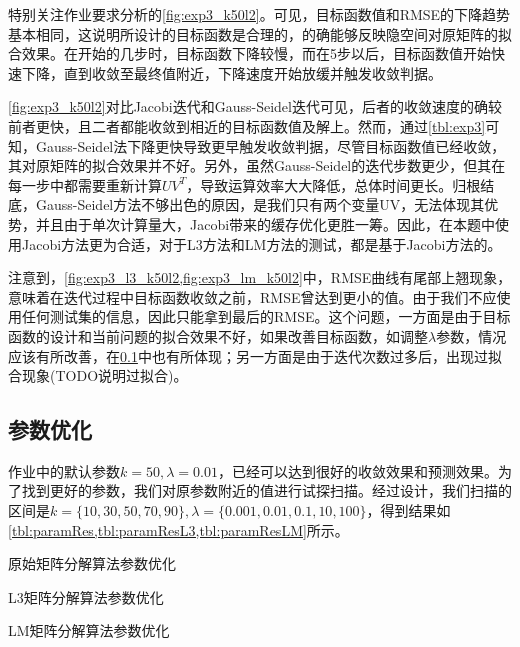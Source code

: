 \documentclass[a4paper,12pt]{article}
\begin{document}
    特别关注作业要求分析的\cref{fig:exp3_k50l2}。可见，目标函数值和RMSE的下降趋势基本相同，这说明所设计的目标函数是合理的，的确能够反映隐空间对原矩阵的拟合效果。在开始的几步时，目标函数下降较慢，而在5步以后，目标函数值开始快速下降，直到收敛至最终值附近，下降速度开始放缓并触发收敛判据。

    \cref{fig:exp3_k50l2}对比Jacobi迭代和Gauss-Seidel迭代可见，后者的收敛速度的确较前者更快，且二者都能收敛到相近的目标函数值及解上。然而，通过\cref{tbl:exp3}可知，Gauss-Seidel法下降更快导致更早触发收敛判据，尽管目标函数值已经收敛，其对原矩阵的拟合效果并不好。另外，虽然Gauss-Seidel的迭代步数更少，但其在每一步中都需要重新计算$UV^T$，导致运算效率大大降低，总体时间更长。归根结底，Gauss-Seidel方法不够出色的原因，是我们只有两个变量UV，无法体现其优势，并且由于单次计算量大，Jacobi带来的缓存优化更胜一筹。因此，在本题中使用Jacobi方法更为合适，对于L3方法和LM方法的测试，都是基于Jacobi方法的。

    注意到，\cref{fig:exp3_l3_k50l2,fig:exp3_lm_k50l2}中，RMSE曲线有尾部上翘现象，意味着在迭代过程中目标函数收敛之前，RMSE曾达到更小的值。由于我们不应使用任何测试集的信息，因此只能拿到最后的RMSE。这个问题，一方面是由于目标函数的设计和当前问题的拟合效果不好，如果改善目标函数，如调整$\lambda$参数，情况应该有所改善，在\cref{sub:param}中也有所体现；另一方面是由于迭代次数过多后，出现过拟合现象(TODO说明过拟合)。

    \subsection{参数优化}
    \label{sub:param}
    作业中的默认参数$k=50,\lambda=0.01$，已经可以达到很好的收敛效果和预测效果。为了找到更好的参数，我们对原参数附近的值进行试探扫描。经过设计，我们扫描的区间是$k=\{10,30,50,70,90\},\lambda=\{0.001,0.01,0.1,10,100\}$，得到结果如\cref{tbl:paramRes,tbl:paramResL3,tbl:paramResLM}所示。

    \begin{table}[htbp]
      \centering
      \caption{原始矩阵分解算法参数优化}
      \label{tbl:paramRes}
      
    \end{table}
    \begin{table}[htbp]
      \centering
      \caption{L3矩阵分解算法参数优化}
      \label{tbl:paramResL3}
      
    \end{table}
    \begin{table}[htbp]
      \centering
      \caption{LM矩阵分解算法参数优化}
      \label{tbl:paramResLM}
      
    \end{table}
\end{document}
